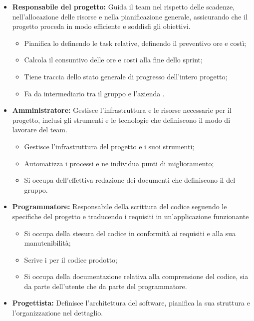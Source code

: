 \begin{itemize}
	\item \textbf{Responsabile del progetto:} Guida il team nel rispetto delle scadenze, nell'allocazione delle risorse e nella pianificazione generale, assicurando che il progetto proceda in modo efficiente e soddisfi gli obiettivi.
	\begin{itemize}
    \item Pianifica lo  definendo le task relative, definendo il preventivo ore e
        costì;
    \item Calcola il consuntivo delle ore e costi alla fine dello sprint;
    \item Tiene traccia dello stato generale di progresso dell'intero progetto;
    \item Fa da intermediario tra il gruppo e l'azienda .
  \end{itemize}
	\item \textbf{Amministratore:} Gestisce l'infrastruttura e le risorse necessarie per il progetto, inclusi gli strumenti e le tecnologie che definiscono il modo di lavorare del team.
	\begin{itemize}
    \item Gestisce l'infrastruttura del progetto e i suoi strumenti;
    \item Automatizza i processi e ne individua punti di miglioramento;
    \item Si occupa dell'effettiva redazione dei documenti che definiscono il  del gruppo.
	\end{itemize}
  \item \textbf{Programmatore:} Responsabile della scrittura del codice seguendo le specifiche del progetto e traducendo i requisiti in un'applicazione funzionante
	\begin{itemize}
    \item Si occupa della stesura del codice in conformità ai requisiti e alla sua manutenibilità;
    \item Scrive i  per il codice prodotto;
    \item Si occupa della documentazione relativa alla comprensione del codice, sia da parte
        dell'utente che da parte del programmatore.
  \end{itemize}
  \item \textbf{Progettista:} Definisce l'architettura del software, pianifica la sua struttura e l'organizzazione nel dettaglio.
	\begin{itemize}

\end{itemize}
\end{itemize}
